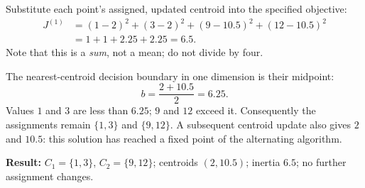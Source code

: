Substitute each point's assigned, updated centroid into the specified objective:
\begin{align*}
J^{(1)}&=(1-2)^2+(3-2)^2+(9-10.5)^2+(12-10.5)^2\\
&=1+1+2.25+2.25=\boxed{6.5}.
\end{align*}
Note that this is a \emph{sum}, not a mean; do not divide by four.

The nearest-centroid decision boundary in one dimension is their midpoint:
\[
b=\frac{2+10.5}{2}=6.25.
\]
Values $1$ and $3$ are less than $6.25$; $9$ and $12$ exceed it. Consequently the assignments remain $\{1,3\}$ and $\{9,12\}$. A subsequent centroid update also gives $2$ and $10.5$: this solution has reached a fixed point of the alternating algorithm.
\begin{answer}
\textbf{Result:} $C_1=\{1,3\}$, $C_2=\{9,12\}$; centroids $(2,10.5)$; inertia $6.5$; no further assignment changes.
\end{answer}
